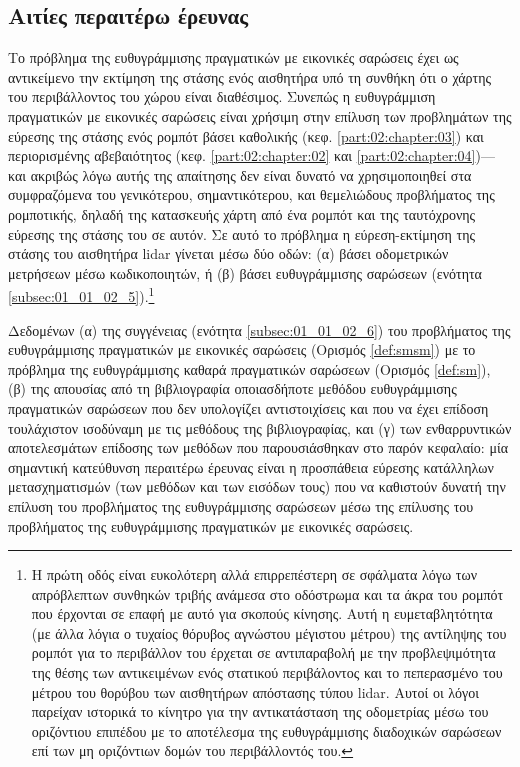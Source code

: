 \subsection{Αιτίες περαιτέρω έρευνας}
\label{subsection:02_04_07:02}

Το πρόβλημα της ευθυγράμμισης πραγματικών με εικονικές σαρώσεις έχει ως
αντικείμενο την εκτίμηση της στάσης ενός αισθητήρα υπό τη συνθήκη ότι ο χάρτης
του περιβάλλοντος του χώρου είναι διαθέσιμος. Συνεπώς η ευθυγράμμιση
πραγματικών με εικονικές σαρώσεις είναι χρήσιμη στην επίλυση των προβλημάτων
της εύρεσης της στάσης ενός ρομπότ βάσει καθολικής (κεφ.
\ref{part:02:chapter:03}) και περιορισμένης αβεβαιότητος (κεφ.
\ref{part:02:chapter:02} και \ref{part:02:chapter:04})---και ακριβώς λόγω αυτής
της απαίτησης δεν είναι δυνατό να χρησιμοποιηθεί στα συμφραζόμενα του
γενικότερου, σημαντικότερου, και θεμελιώδους προβλήματος της ρομποτικής, δηλαδή
της κατασκευής χάρτη από ένα ρομπότ και της ταυτόχρονης εύρεσης της στάσης του
σε αυτόν. Σε αυτό το πρόβλημα η εύρεση-εκτίμηση της στάσης του αισθητήρα lidar
γίνεται μέσω δύο οδών: (α) βάσει οδομετρικών μετρήσεων μέσω κωδικοποιητών, ή
(β) βάσει ευθυγράμμισης σαρώσεων (ενότητα \ref{subsec:01_01_02_5}).\footnote{Η
πρώτη οδός είναι ευκολότερη αλλά επιρρεπέστερη σε σφάλματα λόγω των απρόβλεπτων
συνθηκών τριβής ανάμεσα στο οδόστρωμα και τα άκρα του ρομπότ που έρχονται σε
επαφή με αυτό για σκοπούς κίνησης. Αυτή η ευμεταβλητότητα (με άλλα λόγια ο
τυχαίος θόρυβος αγνώστου μέγιστου μέτρου) της αντίληψης του ρομπότ για το
περιβάλλον του έρχεται σε αντιπαραβολή με την προβλεψιμότητα της θέσης των
αντικειμένων ενός στατικού περιβάλοντος και το πεπερασμένο του μέτρου του
θορύβου των αισθητήρων απόστασης τύπου lidar. Αυτοί οι λόγοι παρείχαν ιστορικά
το κίνητρο για την αντικατάσταση της οδομετρίας μέσω του οριζόντιου επιπέδου με
το αποτέλεσμα της ευθυγράμμισης διαδοχικών σαρώσεων επί των μη οριζόντιων δομών
του περιβάλλοντός του.}

Δεδομένων (α) της συγγένειας (ενότητα \ref{subsec:01_01_02_6}) του προβλήματος
της ευθυγράμμισης πραγματικών με εικονικές σαρώσεις (Ορισμός \ref{def:smsm}) με
το πρόβλημα της ευθυγράμμισης καθαρά πραγματικών σαρώσεων (Ορισμός
\ref{def:sm}), (β) της απουσίας από τη βιβλιογραφία οποιασδήποτε μεθόδου
ευθυγράμμισης πραγματικών σαρώσεων που δεν υπολογίζει αντιστοιχίσεις και που να
έχει επίδοση τουλάχιστον ισοδύναμη με τις μεθόδους της βιβλιογραφίας, και (γ)
των ενθαρρυντικών αποτελεσμάτων επίδοσης των μεθόδων που παρουσιάσθηκαν στο
παρόν κεφαλαίο: μία σημαντική κατεύθυνση περαιτέρω έρευνας είναι η προσπάθεια
εύρεσης κατάλληλων μετασχηματισμών (των μεθόδων και των εισόδων τους) που να
καθιστούν δυνατή την επίλυση του προβλήματος της ευθυγράμμισης σαρώσεων μέσω
της επίλυσης του προβλήματος της ευθυγράμμισης πραγματικών με εικονικές
σαρώσεις.
